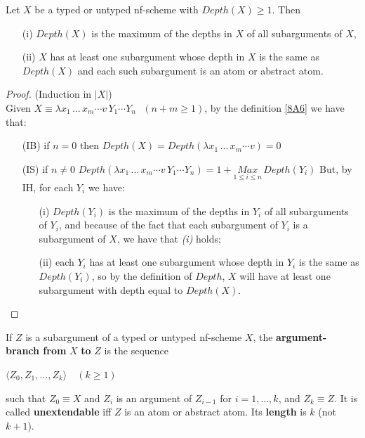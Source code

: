 \documentclass[a4paper,10pt]{article}
\begin{document}
\begin{lem}\label{8E3.1} Let $X$ be a typed or untyped nf-scheme with $Depth(X)\geq 1$. Then
\begin{itemize}
 \item[(i)] $Depth(X)$ is the maximum of the depths in $X$ of all subarguments of $X$,
 \item[(ii)] $X$ has at least one subargument whose depth in $X$ is the same as $Depth(X)$ and each such subargument is an atom or abstract atom.
\end{itemize}
\begin{proof}(Induction in $|X|$)\\

\noindent Given $X \equiv \lambda x_1\, ...\, x_m \cdots v\,Y_1 \cdots Y_n\,\,\,\,(n + m \geq 1)$, 
  by the definition \ref{8A6} we have that:
  \begin{itemize}
   \item[(IB)] if $n = 0$ then $Depth(X) = Depth(\lambda x_1\, ...\, x_m \cdots v) = 0$ 
   \item[(IS)] if $n \neq 0$ $Depth(\lambda x_1\, ...\, x_m \cdots v\,Y_1 \cdots Y_n) = 1 + \underset{1 \leq i \leq n}{Max}\,Depth(Y_i)$
  But, by IH, for each $Y_i$ we have:
  \begin{itemize}
   \item[(i)] $Depth(Y_i)$ is the maximum of the depths in $Y_i$ of all subarguments of $Y_i$, and because of the fact that each subargument
   of $Y_i$ is a subargument of $X$, we have that {\em (i)} holds;
   \item[(ii)] each $Y_i$ has at least one subargument whose depth in $Y_i$ is the same as $Depth(Y_i)$, so by the definition of $Depth$, 
   $X$ will have at least one subargument with depth equal to $Depth(X)$.
  \end{itemize}
 \end{itemize}
 
\end{proof}
\end{lem}


\begin{mydef} If $Z$ is a subargument of a typed or untyped nf-scheme $X$, the \textbf{argument-branch from} $X$ \textbf{to} $Z$ is the 
sequence
\begin{center}
  $\langle Z_0, Z_1, ..., Z_k\rangle\,\,\,\,\,\, (k \geq 1)$
\end{center}
such that $Z_0 \equiv X$ and $Z_i$ is an argument of $Z_{i - 1}$ for $i = 1, ..., k$, and $Z_k \equiv Z$. It is called \textbf{unextendable} iff
$Z$ is an atom or abstract atom. Its \textbf{length} is $k$ (not $k + 1$).
\end{mydef}
\end{document}
